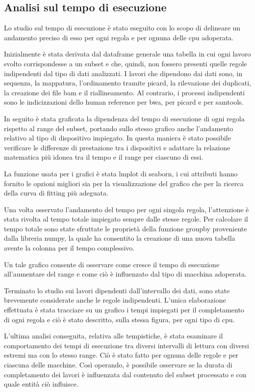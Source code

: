 \subsection{Analisi sul tempo di esecuzione}
Lo studio sul tempo di esecuzione è stato eseguito con lo scopo di delineare un andamento preciso di esso per ogni regola e per ognuna delle cpu adoperata.  

Inizialmente è stata derivata dal dataframe generale una tabella in cui ogni lavoro svolto corrispondesse a un subset e che, quindi, non fossero presenti quelle regole indipendenti dal tipo di dati analizzati.
I lavori che dipendono dai dati sono, in sequenza, la mappatura, l'ordinamento tramite picard, la rilevazione dei duplicati, la creazione dei file bam e il riallineamento.
Al contrario, i processi indipendenti sono le indicizzazioni dello human reference per bwa, per picard e per samtools. 

In seguito è stata graficata la dipendenza del tempo di esecuzione di ogni regola rispetto al range del subset, portando sullo stesso grafico anche l'andamento relativo al tipo di dispositivo impiegato. 
In questa maniera è stato possibile verificare le differenze di prestazione tra i dispositivi e adattare la relazione matematica più idonea tra il tempo e il range per ciascuno di essi.

La funzione usata per i grafici è stata lmplot di seaborn, i cui attributi hanno fornito le opzioni migliori sia per la visualizzazione del grafico che per la ricerca della curva di fitting più adeguata.

Una volta osservato l'andamento del tempo per ogni singola regola, l'attenzione è stata rivolta al tempo totale impiegato sempre dalle stesse regole.
Per calcolare il tempo totale sono state sfruttate le proprietà della funzione groupby proveniente dalla libreria numpy, la quale ha consentito la creazione di una nuova tabella avente la colonna per il tempo complessivo.

Un tale grafico consente di osservare come cresce il tempo di esecuzione all'aumentare del range e come ciò è influenzato dal tipo di macchina adoperata.

Terminato lo studio sui lavori dipendenti dall'intervallo dei dati, sono state brevemente considerate anche le regole indipendenti.
L'unica elaborazione effettuata è stata tracciare su un grafico i tempi impiegati per il completamento di ogni regola e ciò è stato descritto, sulla stessa figura, per ogni tipo di cpu.

L'ultima analisi conseguita, relativa alle tempistiche, è stata esaminare il comportamento dei tempi di esecuzione tra diversi intervalli di lettura con diversi estremi ma con lo stesso range.
Ciò è stato fatto per ognuna delle regole e per ciascuna delle macchine.
Così operando, è possibile osservare se la durata di completamento dei lavori è influenzata dal contenuto del subset processato e con quale entità ciò influisce.

